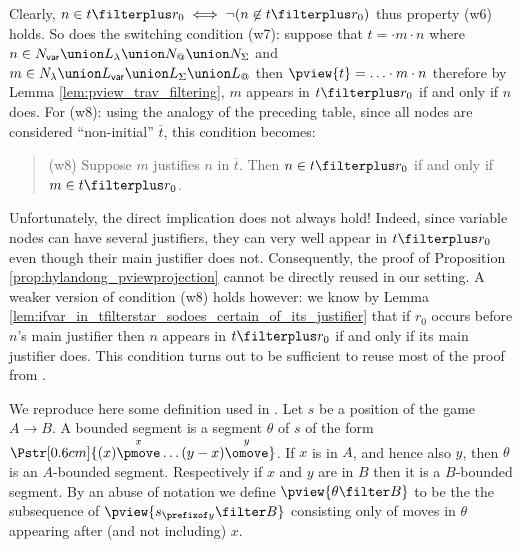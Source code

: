 Clearly, $n \in t\filterplus r_0 \iff \neg ( n \not\in t\filterplus
r_0)$ thus property (w6) holds. So does the switching condition
(w7): suppose that $t = \cdot m \cdot n$ where $n\in N_{\sf var}
\union L_\lambda \union N_@ \union N_\Sigma$ and $m \in N_\lambda
\union L_{\sf var} \union L_\Sigma \union L_@$ then $\pview{t} =
\ldots \cdot m \cdot n$ therefore by Lemma
\ref{lem:pview_trav_filtering}, $m$ appears in $t\filterplus r_0$ if
and only if $n$ does.
For (w8): using the analogy of the preceding table, since all nodes
are considered ``non-initial'' $\overline{t}$, this condition
becomes:
\begin{quote}
 (w8) Suppose $m$ justifies $n$ in $\overline{t}$. Then $n \in t\filterplus r_0$ if and only if $m\in t\filterplus r_0$.
\end{quote}
Unfortunately, the direct implication does not always hold! Indeed, since variable nodes can have several
justifiers, they can very well appear in $t\filterplus r_0$ even
though their main justifier does not. Consequently, the proof of Proposition \ref{prop:hylandong_pviewprojection} cannot be
directly reused in our setting. A weaker version of condition (w8) holds however: we know by Lemma \ref{lem:ifvar_in_tfilterstar_sodoes_certain_of_its_justifier} that
if $r_0$ occurs before $n$'s main justifier then $n$ appears in
$t\filterplus r_0$ if and only if its main justifier does.
This condition turns out to be sufficient to reuse most of the proof from \cite{hylandong_pcf}.

We reproduce here some definition used in \cite{hylandong_pcf}. Let
$s$ be a position of the game $A\rightarrow B$. A bounded segment is
a segment $\theta$ of $s$ of the form
$\Pstr[0.6cm]{(x){\stackrel{x}\pmove} \ldots
(y-x){\stackrel{y}\omove}}$. If $x$ is in $A$, and hence also $y$,
then $\theta$ is an $A$-bounded segment. Respectively if $x$ and $y$
are in $B$ then it is a $B$-bounded segment. By an abuse of notation
we define $\pview{\theta \filter B}$ to be the the subsequence of
$\pview{s_{\prefixof y} \filter B}$ consisting only of moves in
$\theta$ appearing after (and not including) $x$.

